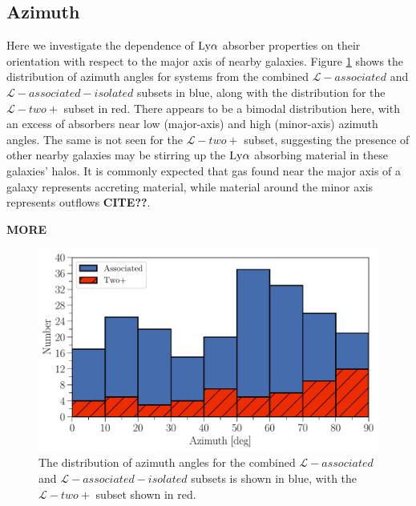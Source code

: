 \documentclass[twocolumn,tighten]{aastex62}
\begin{document}


\subsection{Azimuth}
Here we investigate the dependence of $\rm Ly\alpha$ absorber properties on their orientation with respect to the major axis of nearby galaxies. Figure \ref{azimuth_dist} shows the distribution of azimuth angles for systems from the combined $\mathcal{L}-associated$ and $\mathcal{L}-associated-isolated$ subsets in blue, along with the distribution for the $\mathcal{L}-two+$ subset in red. There appears to be a bimodal distribution here, with an excess of absorbers near low (major-axis) and high (minor-axis) azimuth angles. The same is not seen for the 
$\mathcal{L}-two+$ subset, suggesting the presence of other nearby galaxies may be stirring up the $\rm Ly\alpha$ absorbing material in these galaxies' halos. It is commonly expected that gas found near the major axis of a galaxy represents accreting material, while material around the minor axis represents outflows \textbf{CITE??}. 

\textbf{MORE}

\begin{figure}
\centering
  \includegraphics[width=0.99\linewidth]{hist(azimuth)_all_assoc_vs_not_dataset_double.pdf}
  \caption{\small{The distribution of azimuth angles for the combined $\mathcal{L}-associated$ and $\mathcal{L}-associated-isolated$ subsets is shown in blue, with the $\mathcal{L}-two+$ subset shown in red.}}
\label{azimuth_dist}
\vspace{0pt}
\end{figure}
\end{document}

